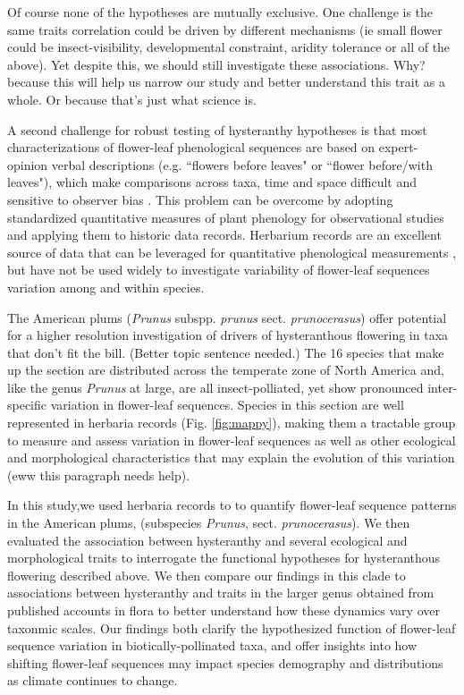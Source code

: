 \documentclass{article}[11pt]
\begin{document}
Of course none of the hypotheses are mutually exclusive. One challenge is the same traits correlation could be driven by different mechanisms (ie small flower could be insect-visibility, developmental constraint, aridity tolerance or all of the above). Yet despite this, we should still investigate these associations. Why? because this will help us narrow our study and better understand this trait as a whole. Or because that's just what science is.

\noindent A second challenge for robust testing of hysteranthy hypotheses is that most characterizations of flower-leaf phenological sequences are based on expert-opinion verbal descriptions (e.g. ``flowers before leaves" or ``flower before/with leaves"), which make comparisons across taxa, time and space difficult and sensitive to observer bias  \citep[see;][]{Buonaiuto2020}. This problem can be overcome by adopting standardized quantitative measures of plant phenology for observational studies and applying them to historic data records. Herbarium records are an excellent source of data that can be leveraged for quantitative phenological measurements \citep{Willis2017}, but have not be used widely to investigate variability of flower-leaf sequences variation among and within species.

The American plums (\textit{Prunus} subspp. \textit{prunus} sect. \textit{prunocerasus}) offer potential for a higher resolution investigation of drivers of hysteranthous flowering in taxa that don't fit the bill. (Better topic sentence needed.) The 16 species that make up the section are distributed across the temperate zone of North America and, like the genus \textit{Prunus} at large, are all insect-polliated, yet show pronounced inter-specific variation in flower-leaf sequences.  Species in this section are well represented in herbaria records (Fig. \ref{fig:mappy}), making them a tractable group to measure and assess variation in flower-leaf sequences as well as other ecological and morphological characteristics that may explain the evolution of this variation (eww this paragraph needs help). 

\noindent In this study,we used herbaria records to to quantify flower-leaf sequence patterns in the American plums, (subspecies  \textit{Prunus}, sect. \textit{prunocerasus}). We then evaluated the association between hysteranthy and several ecological and morphological traits to interrogate the functional hypotheses for hysteranthous flowering described above. We then compare our findings in this clade to associations between hysteranthy and traits in the larger genus obtained from published accounts in flora to better understand how these dynamics vary over taxonmic scales. Our findings both clarify the hypothesized function of flower-leaf sequence variation in biotically-pollinated taxa, and offer insights into how shifting flower-leaf sequences may impact species demography and distributions as climate continues to change.

 
\end{document}
